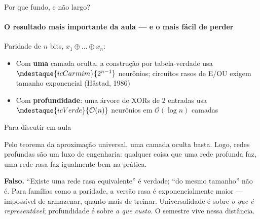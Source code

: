 \documentclass[aspectratio=169, 11pt]{beamer}
\begin{document}
\begin{frame}{Por que fundo, e não largo?}
  \framesubtitle{O resultado mais importante da aula — e o mais fácil de perder}

  Paridade de $n$ bits, \(x_1 \oplus \dots \oplus x_n\):

  \begin{itemize}\setlength{\itemsep}{0.35ex}
    \item<1-> Com \textbf{uma} camada oculta, a construção por tabela-verdade
          usa \(\mdestaque{icCarmim}{2^{n-1}}\) neurônios; circuitos rasos de
          E/OU exigem tamanho exponencial (Håstad, 1986)
    \item<2-> Com \textbf{profundidade}: uma árvore de XORs de 2 entradas usa
          \(\mdestaque{icVerde}{\mathcal{O}(n)}\) neurônios em
          \(\mathcal{O}(\log n)\) camadas
  \end{itemize}


\end{frame}

\begin{frame}{Para discutir em aula}
  \begin{quizbox}
    Pelo teorema da aproximação universal, uma camada oculta basta. Logo, redes
    profundas são um luxo de engenharia: qualquer coisa que uma rede profunda
    faz, uma rede rasa faz igualmente bem na prática.

    \smallskip
  \end{quizbox}

  \pause

  \begin{respbox}
    \textbf{Falso.} ``Existe uma rede rasa equivalente'' é verdade; ``do mesmo
    tamanho'' não é. Para famílias como a paridade, a versão rasa é
    \alert{exponencialmente} maior — impossível de armazenar, quanto mais de
    treinar. Universalidade é sobre \emph{o que é representável};
    profundidade é sobre \emph{a que custo}. O semestre vive nessa distância.
  \end{respbox}
\end{frame}
\end{document}
